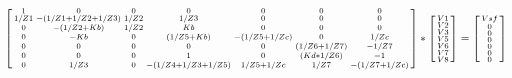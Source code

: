 \(
\begin{bsmallmatrix}
1 & 0 & 0 & 0 & 0 & 0 & 0\\
1/Z1 & -(1/Z1 + 1/Z2 + 1/Z3) & 1/Z2 & 1/Z3 & 0 & 0 & 0\\
0 & -(1/Z2 + Kb) & 1/Z2 & Kb & 0 & 0 & 0\\
0 & -Kb & 0 & (1/Z5 + Kb) & -(1/Z5+1/Zc) & 0 & 1/Zc\\
0 & 0 & 0 & 0 & 0 & (1/Z6 + 1/Z7) & -1/Z7\\
0 & 0 & 0 & 1 & 0 & (Kd * 1/Z6) & -1\\
0 & 1/Z3 & 0 & -(1/Z4 + 1/Z3 + 1/Z5) & 1/Z5+1/Zc & 1/Z7 & -(1/Z7+1/Zc)\\
\end{bsmallmatrix}
*
\begin{bsmallmatrix}
V1\\V2\\V3\\V5\\V6\\V7\\V8
\end{bsmallmatrix}
=
\begin{bsmallmatrix}
Vsf\\0\\0\\0\\0\\0\\0
\end{bsmallmatrix}
\)
